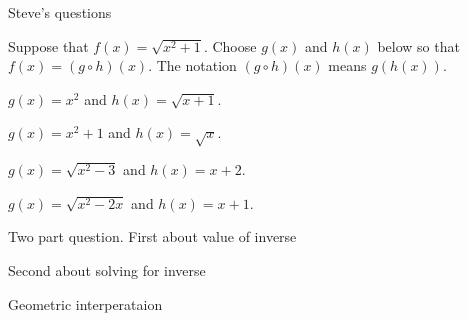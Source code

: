 

\begin{exercise}
Steve's questions
\end{exercise}


\begin{exercise}
Suppose that $f(x) = \sqrt{x^2+1}$. Choose $g(x)$ and $h(x)$ below so
that $f(x) = (g\circ h)(x)$. The notation $(g\circ h)(x)$ means
$g(h(x))$.
\begin{multiple-choice}[4]
\item $g(x) = x^2$ and $h(x) = \sqrt{x+1}$.
\item $g(x) = x^2 + 1$ and $h(x) = \sqrt{x}$.
\item $g(x) = \sqrt{x^2 -3}$ and $h(x) = x+2$.
\item $g(x) = \sqrt{x^2 -2x}$ and $h(x) = x+1$. 
\end{multiple-choice}
\end{exercise}


\begin{question}
Two part question.
First about value of inverse

Second about solving for inverse
\end{question}


\begin{question}
Geometric interperataion
\end{question}
